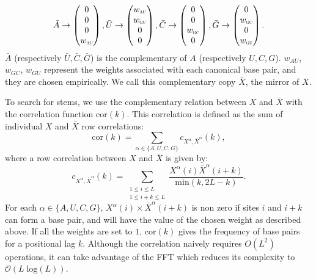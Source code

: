 \begin{equation}
\begin{split}
\bar{A} \rightarrow \begin{pmatrix} 0\\ 0\\ 0\\ w_{\scalebox{0.5}{AU}}\\ \end{pmatrix},
\bar{U} \rightarrow \begin{pmatrix} w_{\scalebox{0.5}{AU}}\\ w_{\scalebox{0.5}{GU}}\\ 0\\ 0\\ \end{pmatrix},
\bar{C} \rightarrow \begin{pmatrix} 0\\ 0\\ w_{\scalebox{0.5}{GC}}\\ 0\\ \end{pmatrix},
\bar{G} \rightarrow \begin{pmatrix} 0\\ w_{\scalebox{0.5}{GC}}\\ 0\\ w_{\scalebox{0.5}{GU}}\\ \end{pmatrix}.
\end{split}
\end{equation}
\(\bar{A}\) (respectively \(\bar{U}, \bar{C}, \bar{G}\)) is the complementary of \(A\) (respectively \(U, C, G\)). \(w_{AU}\), \(w_{GC}\), \(w_{GU}\) represent the weights associated with each canonical base pair, and they are chosen empirically. We call this complementary copy \(\bar{X}\), the mirror of \(X\).

To search for stems, we use the complementary relation between \(X\) and \(\bar{X}\) with the correlation function \(\text{cor}(k)\). This correlation is defined as the sum of individual \(X\) and \(\bar{X}\) row correlations:
\begin{equation}
\text{cor}(k)=\sum_{\alpha \in \{A,U,C,G\}}c_{X^{\alpha},\bar{X}^{\alpha}}(k),
\end{equation}
where a row correlation between \(X\) and \(\bar{X}\) is given by:
\begin{equation}
c_{X^\alpha,\bar{X}^\alpha}(k) = \sum\limits_{\substack{1\leq i \leq L\\1 \leq i + k \leq L}} \frac{X^\alpha(i) \bar{X}^\alpha(i+k)}{\text{min}(k, 2 L-k)}.
\end{equation}
For each \(\alpha \in \{A,U,C,G\}\), \(X^\alpha(i) \times \bar{X}^\alpha(i+k)\) is non zero if sites \(i\) and \(i+k\) can form a base pair, and will have the value of the chosen weight as described above. If all the weights are set to $1$, \(\text{cor}(k)\) gives the frequency of base pairs for a positional lag \(k\). Although the correlation naively requires \(O(L^2)\) operations, it can take advantage of the FFT which reduces its complexity to \(\mathcal{O}(L\;\text{log}(L))\).

